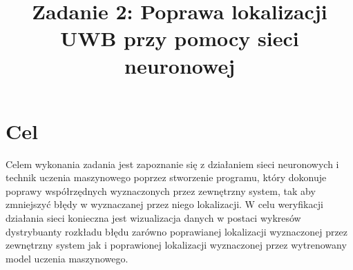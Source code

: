 \documentclass{classrep}
\author{
  \studentinfo{Amadeusz Sitnicki}{242524} \and
  \studentinfo{Artur Surosz}{242542}
}
\title{Zadanie 2: Poprawa lokalizacji UWB przy pomocy sieci neuronowej}
\begin{document}
\maketitle


\section{Cel}
{
Celem wykonania zadania jest zapoznanie się z działaniem sieci neuronowych i technik uczenia maszynowego poprzez stworzenie programu, który dokonuje poprawy współrzędnych wyznaczonych przez zewnętrzny system, tak aby zmniejszyć błędy w wyznaczanej przez niego lokalizacji. W celu weryfikacji działania sieci konieczna jest wizualizacja danych w postaci wykresów dystrybuanty rozkładu błędu zarówno poprawianej lokalizacji wyznaczonej przez zewnętrzny system \ppauza jak i poprawionej lokalizacji wyznaczonej przez wytrenowany model uczenia maszynowego. }
\end{document}
